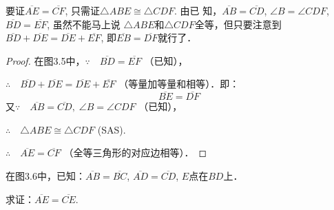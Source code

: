 \begin{analyze}
    要证$\overline{AE}=\overline{CF}$, 只需证$\triangle ABE\cong \triangle CDF$. 由已
知，$\overline{AB}=\overline{CD}$, $\angle B=\angle CDF$, $\overline{BD}=\overline{EF}$, 虽然不能马上说
$\triangle ABE$和$\triangle CDF$全等，但只要注意到$\overline{BD}+\overline{DE}=\overline{DE}+\overline{EF}$, 
即$\overline{EB}=\overline{DF}$就行了．
\end{analyze}

\begin{proof}
    在图3.5中，$\because\quad \overline{BD}=\overline{EF}$ （已知），

$\therefore\quad \overline{BD}+\overline{DE}=\overline{DE}+\overline{EF}$ （等量加等量和相等）．即：
\[\overline{BE}=\overline{DF}\]
又$\because\quad \overline{AB}=\overline{CD},\; \angle B =\angle CDF$ （已知），

$\therefore\quad \triangle ABE\cong \triangle CDF$ (SAS).

$\therefore\quad \overline{AE}=\overline{CF}$ （全等三角形的对应边相等）．
\end{proof}

\begin{figure}[htp]\centering
    \begin{minipage}[t]{0.48\textwidth}
    \centering
{}
    \caption{ }
    \end{minipage}
    \begin{minipage}[t]{0.48\textwidth}
    \centering
    \caption{ }
    \end{minipage}
    \end{figure}

\begin{example}
    在图3.6中，已知：$\overline{AB}=\overline{BC}$, $\overline{AD}=\overline{CD}$, $E$点在$BD$上．

求证：$\overline{AE}=\overline{CE}$.
\end{example}

